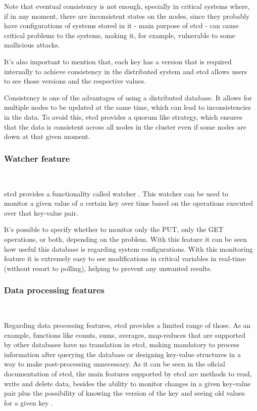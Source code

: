 \documentclass[screen,review]{acmart}
\begin{document}
Note that eventual consistency is not enough, specially in critical systems where, if in any moment, there are inconsistent states on the nodes, since they probably have configurations of systems stored in it - main purpose of etcd - can cause critical problems to the systems, making it, for example, vulnerable to some mallicious attacks.

It's also important to mention that, each key has a version that is required internally to achieve consistency in the distributed system and etcd allows users to see those versions and the respective values.

Consistency is one of the advantages of using a distributed database. It allows for multiple nodes to be updated at the same time, which can lead to inconsistencies in the data. To avoid this, etcd provides a quorum like strategy, which ensures that the data is consistent across all nodes in the cluster even if some nodes are down at that given moment\cite{etcd_api}. \\

\subsubsection{Watcher feature}~\

etcd provides a functionality called watcher \cite{etcd_watcher}. This watcher can be used to monitor a given value of a certain key over time based on the operations executed over that key-value pair.

It's possible to specify whether to monitor only the PUT, only the GET operations, or both, depending on the problem.
With this feature it can be seen how useful this database is regarding system configurations. With this monitoring feature it is extremely easy to see modifications in critical variables in real-time (without resort to polling), helping to prevent any unwanted results. \\

\subsubsection{Data processing features}~\

Regarding data processing features, etcd provides a limited range of those. As an example, functions like counts, sums, averages, map-reduces that are supported by other databases have no translation in etcd, making mandatory to process information after querying the database or designing key-value structures in a way to make post-processing unnecessary.
As it can be seen in the oficial documentation of etcd, the main features supported by etcd are methods to read, write and delete data, besides the ability to monitor changes in a given key-value pair plus the possibility of knowing the version of the key and seeing old values for a given key \cite{etcd_interacting} \cite{etcd_api}.
\end{document}
